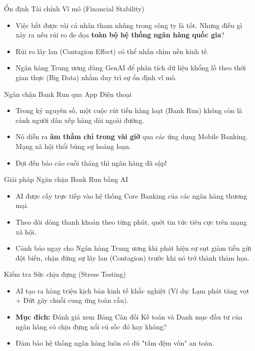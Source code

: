 \documentclass[aspectratio=169]{beamer}
\begin{document}
\begin{frame}{Ổn định Tài chính Vĩ mô (Financial Stability)}
    \begin{itemize}
        \item Việc bắt được vài cá nhân tham nhũng trong công ty là tốt. Nhưng điều gì xảy ra nếu rủi ro đe dọa \textbf{toàn bộ hệ thống ngân hàng quốc gia}?
        \item Rủi ro lây lan (Contagion Effect) có thể nhấn chìm nền kinh tế.
        \item Ngân hàng Trung ương dùng GenAI để phân tích dữ liệu khổng lồ theo thời gian thực (Big Data) nhằm duy trì sự ổn định vĩ mô.
    \end{itemize}
\end{frame}

\begin{frame}{Ngăn chặn Bank Run qua App Điện thoại}
    \begin{itemize}
        \item Trong kỷ nguyên số, một cuộc rút tiền hàng loạt (Bank Run) không còn là cảnh người dân xếp hàng dài ngoài đường. 
        \item Nó diễn ra \textbf{âm thầm chỉ trong vài giờ} qua các ứng dụng Mobile Banking. Mạng xã hội thổi bùng sự hoảng loạn.
        \item Đợi đến báo cáo cuối tháng thì ngân hàng đã sập!
    \end{itemize}
\end{frame}

\begin{frame}{Giải pháp Ngăn chặn Bank Run bằng AI}
    \begin{itemize}
        \item AI được cấy trực tiếp vào hệ thống Core Banking của các ngân hàng thương mại.
        \item Theo dõi dòng thanh khoản theo từng phút, quét tin tức tiêu cực trên mạng xã hội.
        \item Cảnh báo ngay cho Ngân hàng Trung ương khi phát hiện sự sụt giảm tiền gửi đột biến, chặn đứng sự lây lan (Contagion) trước khi nó trở thành thảm họa.
    \end{itemize}
\end{frame}

\begin{frame}{Kiểm tra Sức chịu đựng (Stress Testing)}
    \begin{itemize}
        \item AI tạo ra hàng triệu kịch bản kinh tế khắc nghiệt (Ví dụ: Lạm phát tăng vọt + Đứt gãy chuỗi cung ứng toàn cầu).
        \item \textbf{Mục đích:} Đánh giá xem Bảng Cân đối Kế toán và Danh mục đầu tư của ngân hàng có chịu đựng nổi cú sốc đó hay không?
        \item Đảm bảo hệ thống ngân hàng luôn có đủ "tấm đệm vốn" an toàn.
    \end{itemize}
\end{frame}
\end{document}
